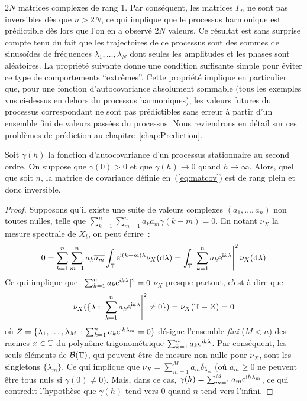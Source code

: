 $2 N$ matrices complexes de rang 1. Par cons\'equent, les matrices
$\Gamma_n$ ne sont pas inversibles d\`es que $n > 2N$, ce qui
implique que le processus harmonique est pr\'edictible d\`es lors
que l'on en a observ\'e $2N$ valeurs. Ce r\'esultat est sans surprise
compte tenu du fait que les trajectoires de ce processus sont des
sommes de sinuso\"{i}des de fr\'equences $\lambda_1,\dots,
\lambda_N$ dont seules les amplitudes et les phases sont
al\'eatoires. La propri\'et\'e suivante donne une condition suffisante
simple pour \'eviter ce type de comportements ``extr\^{e}mes''.
Cette propri\'et\'e implique en particulier que, pour une fonction
d'autocovariance absolument sommable (tous les exemples vus
ci-dessus en dehors du processus harmoniques), les valeurs futures
du processus correspondant ne sont pas pr\'edictibles sans erreur \`a
partir d'un ensemble fini de valeurs pass\'ees du processus. Nous
reviendrons en d\'etail sur ces probl\`emes de pr\'ediction au
chapitre~\ref{chap:Prediction}.
\begin{proposition}
 \label{prop:Gammanrangplein}
Soit $\gamma(h)$ la fonction d'autocovariance d'un processus
stationnaire au second ordre. On suppose que $\gamma(0)>0$ et que
$\gamma(h)\rightarrow 0$ quand $h\rightarrow \infty$. Alors, quel
que soit $n$, la matrice de covariance d\'efinie
en~(\ref{eq:matcov}) est de rang plein et donc inversible.
\end{proposition}
\begin{proof}\smartqed
 Supposons qu'il existe une suite de valeurs complexes $(a_1,\dots,a_n)$
non toutes nulles, telle que $\sum_{k=1}^n\sum_{m=1}^n a_k \overline{a_m}
\gamma(k-m)=0$. En notant $\nu_X$ la mesure spectrale de $X_t$, on
peut \'ecrire~:
\begin{eqnarray*}
  0
    =\sum_{k=1}^n\sum_{m=1}^n a_k \overline{a_m}
\int_{\mathbb{T}} \mathrm{e}^{\mathrm{i}(k-m)\lambda}\nu_X(\mathrm{d}\lambda)
    =\int_{\mathbb{T}} \left| \sum_{k=1}^n a_k \mathrm{e}^{\mathrm{i} k \lambda}\right|^2 \nu_X(\mathrm{d}\lambda)
\end{eqnarray*}
Ce qui implique que $| \sum_{k=1}^n a_k \mathrm{e}^{\mathrm{i} k \lambda}|^2=0$ $\nu_X$ presque partout, c'est \`a dire que $$
\nu_X(\{\lambda
: \left| \sum_{k=1}^n a_k \mathrm{e}^{\mathrm{i} k \lambda}\right|^2\neq 0\})=\nu_X(\mathbb{T}-Z)=0
$$
o\`u
$Z=\{\lambda_1,\dots,\lambda_M\,: \sum_{k=1}^n a_k \mathrm{e}^{\mathrm{i} k \lambda_m}
= 0\}$ d\'esigne l'ensemble \emph{fini} ($M<n$) des racines $x\in \mathbb{T}$
du polyn\^ome trigonom\'etrique $\sum_{k=1}^n a_k \mathrm{e}^{\mathrm{i} k \lambda}$. Par
cons\'equent, les seuls \'el\'ements de $\mathcal{B}(\mathbb{T})$, qui peuvent \^{e}tre
de mesure non nulle pour $\nu_X$, sont les singletons
$\{\lambda_m\}$. Ce qui implique que $\nu_X=\sum_{m=1}^M a_m
\delta_{\lambda_m}$ (o\`u $a_m\geq 0$ ne peuvent \^{e}tre tous
nuls si $\gamma(0)\neq 0$). Mais, dans ce cas,
$\gamma(h)=\sum_{m=1}^M a_m \mathrm{e}^{\mathrm{i} h\lambda_m}$, ce qui contredit
l'hypoth\`ese que $\gamma(h)$ tend vers $0$ quand $n$ tend vers
l'infini.
\end{proof}




